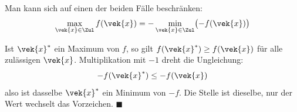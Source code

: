 \begin{merksatz}
Man kann sich auf einen der beiden Fälle beschränken:
\[ \max_{\vek{x}\in\Zul} f(\vek{x}) = -\min_{\vek{x}\in\Zul}\bigl(-f(\vek{x})\bigr) \]

Ist $\vek{x}^{*}$ ein Maximum von $f$, so gilt $f(\vek{x}^{*}) \ge f(\vek{x})$ für alle zulässigen $\vek{x}$. Multiplikation mit $-1$ dreht die Ungleichung:
\[ -f(\vek{x}^{*}) \le -f(\vek{x}) \]
also ist dasselbe $\vek{x}^{*}$ ein Minimum von $-f$. Die Stelle ist dieselbe, nur der Wert wechselt das Vorzeichen. $\blacksquare$

\begin{center}
\begin{minipage}{0.88\textwidth}
\end{minipage}
\end{center}
\end{merksatz}

